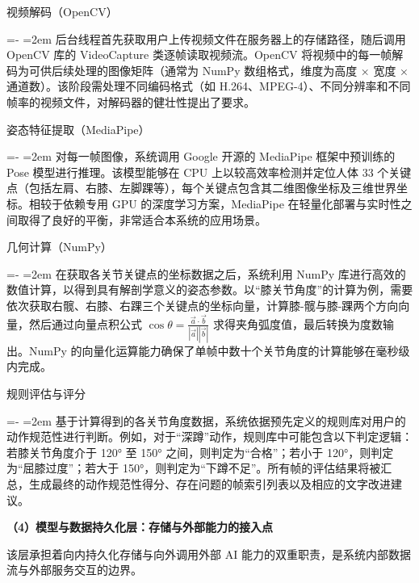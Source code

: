 \documentclass[UTF8,twoside]{ctexrep}
\makeatletter
\def@NAT@last@yr{\@citea}%
\def@NAT@last@yr{-\NAT@penalty}%
\newcommand{\listbodyaligntext}[1]{%
  \par\begingroup
    \leftskip=-\leftmargin
    \rightskip=0pt
    \parindent=2em
    \noindent\hspace*{2em}\ignorespaces#1\unskip\par
  \endgroup
}
\makeatother
\begin{document}
\begin{researchlist}
  
  \item 视频解码（OpenCV）
  \listbodyaligntext{后台线程首先获取用户上传视频文件在服务器上的存储路径，随后调用 OpenCV 库的 VideoCapture 类逐帧读取视频流。OpenCV 将视频中的每一帧解码为可供后续处理的图像矩阵（通常为 NumPy 数组格式，维度为高度 × 宽度 × 通道数）。该阶段需处理不同编码格式（如 H.264、MPEG-4）、不同分辨率和不同帧率的视频文件，对解码器的健壮性提出了要求。}

  
  \item 姿态特征提取（MediaPipe）
  \listbodyaligntext{对每一帧图像，系统调用 Google 开源的 MediaPipe 框架中预训练的 Pose 模型进行推理。该模型能够在 CPU 上以较高效率检测并定位人体 33 个关键点（包括左肩、右膝、左脚踝等），每个关键点包含其二维图像坐标及三维世界坐标。相较于依赖专用 GPU 的深度学习方案，MediaPipe 在轻量化部署与实时性之间取得了良好的平衡，非常适合本系统的应用场景。}

  
  \item 几何计算（NumPy）
  \listbodyaligntext{在获取各关节关键点的坐标数据之后，系统利用 NumPy 库进行高效的数值计算，以得到具有解剖学意义的姿态参数。以“膝关节角度”的计算为例，需要依次获取右髋、右膝、右踝三个关键点的坐标向量，计算膝-髋与膝-踝两个方向向量，然后通过向量点积公式 $\cos\theta = \frac{\vec{a} \cdot \vec{b}}{|\vec{a}| |\vec{b}|}$ 求得夹角弧度值，最后转换为度数输出。NumPy 的向量化运算能力确保了单帧中数十个关节角度的计算能够在毫秒级内完成。}

  
  \item 规则评估与评分
  \listbodyaligntext{基于计算得到的各关节角度数据，系统依据预先定义的规则库对用户的动作规范性进行判断。例如，对于“深蹲”动作，规则库中可能包含以下判定逻辑：若膝关节角度介于 120° 至 150° 之间，则判定为“合格”；若小于 120°，则判定为“屈膝过度”；若大于 150°，则判定为“下蹲不足”。所有帧的评估结果将被汇总，生成最终的动作规范性得分、存在问题的帧索引列表以及相应的文字改进建议。}
\end{researchlist}

\textbf{（4）模型与数据持久化层：存储与外部能力的接入点}

该层承担着向内持久化存储与向外调用外部 AI 能力的双重职责，是系统内部数据流与外部服务交互的边界。
\end{document}

